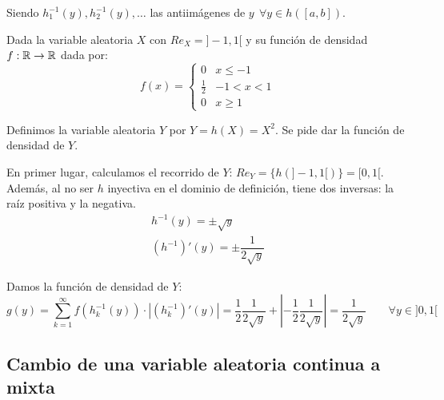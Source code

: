 Siendo $h_1^{-1}(y),h_2^{-1}(y), \ldots$ las antiimágenes de $y~~\forall y \in h([a,b])$.

\begin{ejemplo}
    Dada la variable aleatoria $X$ con $Re_X=]-1, 1[$ y su función de densidad $f:\mathbb R \rightarrow \mathbb R$ dada por:
    $$f(x) = \left\{ \begin{array}{ll}
        0           & x \leq -1  \\
        \frac{1}{2} & -1 < x < 1 \\
        0           & x \geq 1
    \end{array} \right. $$
    
    Definimos la variable aleatoria $Y$ por $Y=h(X) =X^2$. Se pide dar la función de densidad de $Y$.
    
    En primer lugar, calculamos el recorrido de $Y$: $Re_Y=\{h(]-1,1[)\} = [0,1[$. Además, al no ser $h$ inyectiva en el dominio de definición, tiene dos inversas: la raíz positiva y la negativa.
    \begin{gather*}
        h^{-1}(y) = \pm \sqrt{y}\\
        (h^{-1})'(y) = \pm \dfrac{1}{2\sqrt{y}}
    \end{gather*}
    
    Damos la función de densidad de $Y$:
    $$g(y) = \sum_{k=1}^{\infty} f(h^{-1}_k(y)) \cdot |(h^{-1}_k)'(y)|
    =  \dfrac{1}{2} \dfrac{1}{2\sqrt{y}} + \left|-\dfrac{1}{2} \dfrac{1}{2\sqrt{y}}\right|
    =  \dfrac{1}{2\sqrt{y}} \qquad \forall y \in ]0,1[$$
\end{ejemplo}

\subsection{Cambio de una variable aleatoria continua a mixta}

